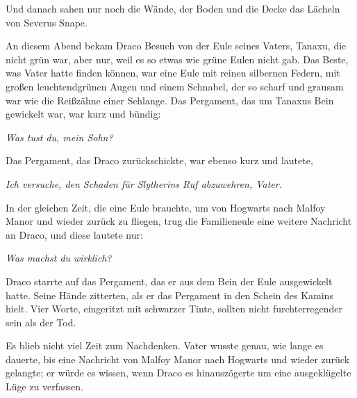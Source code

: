 Und danach sahen nur noch die Wände, der Boden und die Decke das Lächeln von Severus Snape.

\later

An diesem Abend bekam Draco Besuch von der Eule seines Vaters, Tanaxu, die nicht grün war, aber nur, weil es so etwas wie grüne Eulen nicht gab. Das Beste, was Vater hatte finden können, war eine Eule mit reinen silbernen Federn, mit großen leuchtendgrünen Augen und einem Schnabel, der so scharf und grausam war wie die Reißzähne einer Schlange. Das Pergament, das um Tanaxus Bein gewickelt war, war kurz und bündig:

\emph{Was tust du, mein Sohn?}

Das Pergament, das Draco zurückschickte, war ebenso kurz und lautete,

\emph{Ich versuche, den Schaden für Slytherins Ruf abzuwehren, Vater.}

In der gleichen Zeit, die eine Eule brauchte, um von Hogwarts nach Malfoy Manor und wieder zurück zu fliegen, trug die Familieneule eine weitere Nachricht an Draco, und diese lautete nur:

\emph{Was machst du wirklich?}

Draco starrte auf das Pergament, das er aus dem Bein der Eule ausgewickelt hatte. Seine Hände zitterten, als er das Pergament in den Schein des Kamins hielt. Vier Worte, eingeritzt mit schwarzer Tinte, sollten nicht furchterregender sein als der Tod.

Es blieb nicht viel Zeit zum Nachdenken. Vater wusste genau, wie lange es dauerte, bis eine Nachricht von Malfoy Manor nach Hogwarts und wieder zurück gelangte; er würde es wissen, wenn Draco es hinauszögerte um eine ausgeklügelte Lüge zu verfassen.

